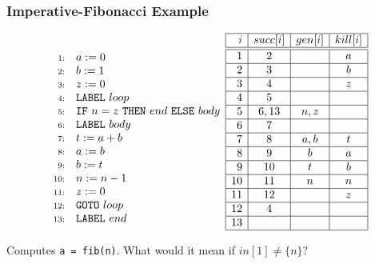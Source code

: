 \documentclass{beamer}
\begin{document}
\begin{frame}
\frametitle{Imperative-Fibonacci Example}

\renewcommand{\arraystretch}{0.9}

\[\begin{array}{rl}\\
\scriptstyle{1:} & a := 0 \\
\scriptstyle{2:} & b := 1 \\
\scriptstyle{3:} & z := 0 \\
\scriptstyle{4:} & {\tt LABEL}~loop \\
\scriptstyle{5:} & {\tt IF}~n=z~{\tt THEN}~end~{\tt ELSE}~body \\
\scriptstyle{6:} & {\tt LABEL}~body \\
\scriptstyle{7:} & t := a+b \\
\scriptstyle{8:} & a := b \\
\scriptstyle{9:} & b := t \\
\scriptstyle{10:} & n := n-1 \\
\scriptstyle{11:} & z := 0 \\
\scriptstyle{12:} & {\tt GOTO}~loop \\
\scriptstyle{13:} & {\tt LABEL}~end
\end{array}\begin{array}{|r|c|c|c|} \hline
i & succ[i] & gen[i] & kill[i] \\\hline\hline
1 & 2 &  & a \\\hline
2 & 3 &  & b \\\hline
3 & 4 &  & z \\\hline
4 & 5 &  &  \\\hline
5 & 6,13 & n,z & \\\hline
6 & 7 &  &  \\\hline
7 & 8 & a,b & t \\\hline
8 & 9 & b & a \\\hline
9 & 10 & t & b \\\hline
10 & 11 & n & n \\\hline
11 & 12 &  & z \\\hline
12 & 4 &  &  \\\hline
13 &  &  &  \\\hline
\end{array}\]

Computes {\tt a = fib(n)}. \alert{What would it mean if $in[1] \not= \{n\}$?}

\end{frame}
\end{document}
